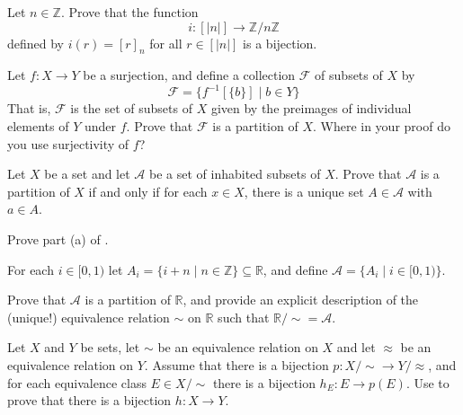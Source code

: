 \begin{exercise}
\label{exCongruenceClassesCorrespondWithRemainders}
Let $n \in \mathbb{Z}$. Prove that the function
\[ i : [|n|] \to \mathbb{Z}/n\mathbb{Z} \]
defined by $i(r) = [r]_n$ for all $r \in [|n|]$ is a bijection.
\end{exercise}


\begin{exercise}
\label{exPreimagesFormPartition}
Let $f : X \to Y$ be a surjection, and define a collection $\mathcal{F}$ of subsets of $X$ by
\[ \mathcal{F} = \{ f^{-1}[\{b\}] \mid b \in Y \} \]
That is, $\mathcal{F}$ is the set of subsets of $X$ given by the preimages of individual elements of $Y$ under $f$. Prove that $\mathcal{F}$ is a partition of $X$. Where in your proof do you use surjectivity of $f$?
\end{exercise}

\begin{exercise}
\label{exConditionsForPartition}
Let $X$ be a set and let $\mathcal{A}$ be a set of inhabited subsets of $X$. Prove that $\mathcal{A}$ is a partition of $X$ if and only if for each $x \in X$, there is a unique set $A \in \mathcal{A}$ with $a \in A$.
\end{exercise}


\begin{exercise}
\label{exQuotientIsPartition}
Prove part (a) of .
\end{exercise}

\begin{exercise}
For each $i \in [0,1)$ let $A_i = \{ i+n \mid n \in \mathbb{Z} \} \subseteq \mathbb{R}$, and define $\mathcal{A} = \{ A_i \mid i \in [0,1) \}$.

Prove that $\mathcal{A}$ is a partition of $\mathbb{R}$, and provide an explicit description of the (unique!) equivalence relation $\sim$ on $\mathbb{R}$ such that $\mathbb{R}/{\sim} = \mathcal{A}$.
\end{exercise}


\begin{exercise}
\label{exBijectionOfQuotientsAndClassesInducesBijectionOfSets}
Let $X$ and $Y$ be sets, let $\sim$ be an equivalence relation on $X$ and let $\approx$ be an equivalence relation on $Y$. Assume that there is a bijection $p : X/{\sim} \to Y/{\approx}$, and for each equivalence class $E \in X/{\sim}$ there is a bijection $h_E : E \to p(E)$. Use  to prove that there is a bijection $h : X \to Y$.
\end{exercise}


